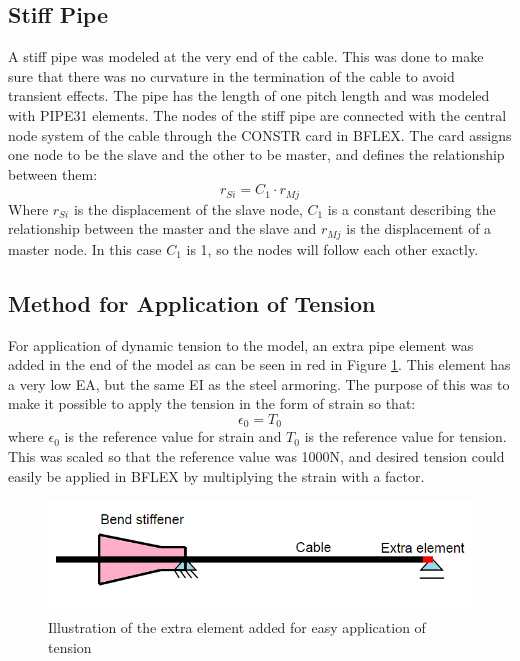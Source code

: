 \subsection{Stiff Pipe}
A stiff pipe was modeled at the very end of the cable. This was done to make sure that there was no curvature in the termination of the cable to avoid transient effects. The pipe has the length of one pitch length and was modeled with PIPE31 elements. The nodes of the stiff pipe are connected with the central node system of the cable through the CONSTR card in BFLEX. The card assigns one node to be the slave and the other to be master, and defines the relationship between them:
\begin{equation}
r_{Si}=C_1 \cdot r_{Mj}    
\end{equation}
Where $r_{Si}$ is the displacement of the slave node,  $C_1$ is a constant describing the relationship between the master and the slave and $r_{Mj}$ is the displacement of a master node.\newline 
\newline 
In this case $C_1$ is 1, so the nodes will follow each other exactly. 

\subsection{Method for Application of Tension}
\noindent For application of dynamic tension to the model, an extra pipe element was added in the end of the model as can be seen in red in Figure \ref{fig:exelem}. This element has a very low EA, but the same EI as the steel armoring. The purpose of this was to make it possible to apply the tension in the form of strain so that:
\begin{equation}
    \epsilon_0 = T_0
\end{equation}
where $\epsilon_0$ is the reference value for strain and $T_0$ is the reference value for tension. This was scaled so that the reference value was 1000N, and desired tension could easily be applied in BFLEX by multiplying the strain with a factor. 
\begin{figure}[H]
\centering
\includegraphics[scale=0.8]{figures/exelem}
\caption[Illustration of the extra element added for easy application of tension]{Illustration of the extra element added for easy application of tension}
 \label{fig:exelem}
\end{figure}

